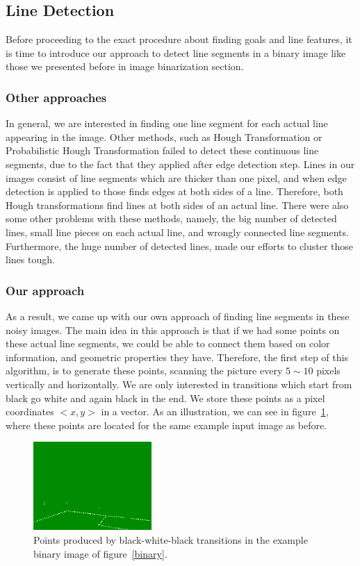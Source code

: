 \documentclass[	DIV=calc,%
							paper=a4,%
							fontsize=9pt,%
							twocolumn]{scrartcl}	 					%
\begin{document}
\subsection{Line Detection}
Before proceeding to the exact procedure about finding goals and line features, it is time to introduce our approach to detect line segments in a binary image like those we presented before in image binarization section.

\subsubsection{Other approaches}
In general, we are interested in finding one line segment for each actual line appearing in the image. Other methods, such as Hough Transformation or Probabilistic Hough Transformation failed to detect these continuous line segments, due to the fact that they applied after edge detection step. Lines in our images consist of line segments which are thicker than one pixel, and when edge detection is applied to those finds edges at both sides of a line. Therefore, both Hough transformations find lines at both sides of an actual line. There were also some other problems with these methods, namely, the big number of detected lines, small line pieces on each actual line, and wrongly connected line segments. Furthermore, the huge number of detected lines, made our efforts to cluster those lines tough.

\subsubsection{Our approach}
As a result, we came up with our own approach of finding line segments in these noisy images. The main idea in this approach is that if we had some points on these actual line segments, we could be able to connect them based on color information, and geometric properties they have. Therefore, the first step of this algorithm, is to generate these points, scanning the picture every $5 \sim 10$ pixels vertically and horizontally. We are only interested in transitions which start from black go white and again black in the end. We store these points as a pixel coordinates $<x,y>$ in a vector. As an illustration, we can see in figure~\ref{points}, where these points are located for the same example input image as before.
\begin{figure}[t!]
\caption{Points produced by black-white-black transitions in the example binary image of figure~\ref{binary}.}
\label{points}
\centering    
\includegraphics[width=0.4\textwidth]{figures/points.png}
\end{figure}
\end{document}
